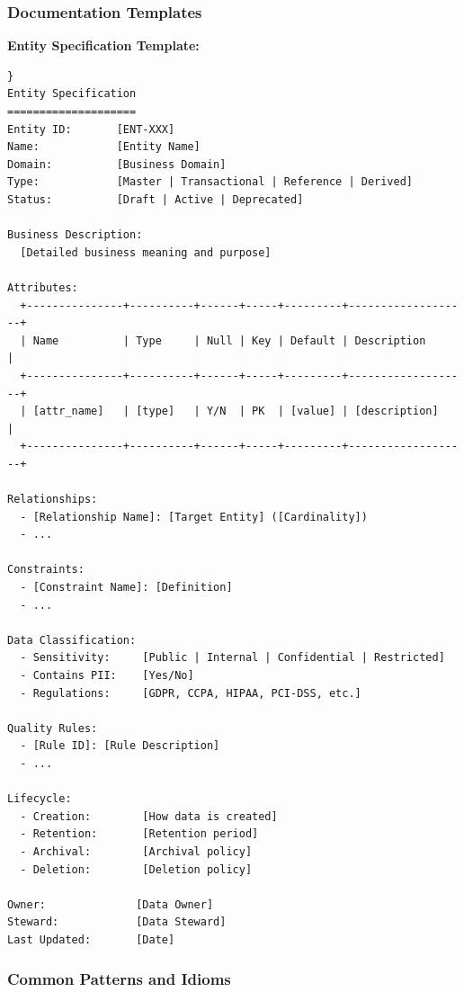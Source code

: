 \documentclass[11pt,letterpaper]{article}
\begin{document}
\subsubsection{Documentation Templates}

\textbf{Entity Specification Template:}

\begin{verbatim}}
Entity Specification
====================
Entity ID:       [ENT-XXX]
Name:            [Entity Name]
Domain:          [Business Domain]
Type:            [Master | Transactional | Reference | Derived]
Status:          [Draft | Active | Deprecated]

Business Description:
  [Detailed business meaning and purpose]

Attributes:
  +---------------+----------+------+-----+---------+-------------------+
  | Name          | Type     | Null | Key | Default | Description       |
  +---------------+----------+------+-----+---------+-------------------+
  | [attr_name]   | [type]   | Y/N  | PK  | [value] | [description]     |
  +---------------+----------+------+-----+---------+-------------------+

Relationships:
  - [Relationship Name]: [Target Entity] ([Cardinality])
  - ...

Constraints:
  - [Constraint Name]: [Definition]
  - ...

Data Classification:
  - Sensitivity:     [Public | Internal | Confidential | Restricted]
  - Contains PII:    [Yes/No]
  - Regulations:     [GDPR, CCPA, HIPAA, PCI-DSS, etc.]

Quality Rules:
  - [Rule ID]: [Rule Description]
  - ...

Lifecycle:
  - Creation:        [How data is created]
  - Retention:       [Retention period]
  - Archival:        [Archival policy]
  - Deletion:        [Deletion policy]

Owner:              [Data Owner]
Steward:            [Data Steward]
Last Updated:       [Date]
\end{verbatim}

\subsubsection{Common Patterns and Idioms}
\end{document}
